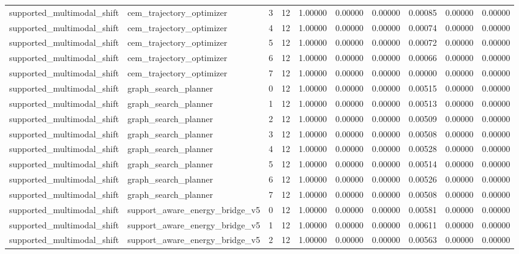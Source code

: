 \documentclass{article}
\begin{document}
\begin{table}[tbp]
{\begin{tabular}{llllllllll}
supported\_multimodal\_shift & cem\_trajectory\_optimizer & 3 & 12 & 1.00000 & 0.00000 & 0.00000 & 0.00085 & 0.00000 & 0.00000 \\
supported\_multimodal\_shift & cem\_trajectory\_optimizer & 4 & 12 & 1.00000 & 0.00000 & 0.00000 & 0.00074 & 0.00000 & 0.00000 \\
supported\_multimodal\_shift & cem\_trajectory\_optimizer & 5 & 12 & 1.00000 & 0.00000 & 0.00000 & 0.00072 & 0.00000 & 0.00000 \\
supported\_multimodal\_shift & cem\_trajectory\_optimizer & 6 & 12 & 1.00000 & 0.00000 & 0.00000 & 0.00066 & 0.00000 & 0.00000 \\
supported\_multimodal\_shift & cem\_trajectory\_optimizer & 7 & 12 & 1.00000 & 0.00000 & 0.00000 & 0.00000 & 0.00000 & 0.00000 \\
supported\_multimodal\_shift & graph\_search\_planner & 0 & 12 & 1.00000 & 0.00000 & 0.00000 & 0.00515 & 0.00000 & 0.00000 \\
supported\_multimodal\_shift & graph\_search\_planner & 1 & 12 & 1.00000 & 0.00000 & 0.00000 & 0.00513 & 0.00000 & 0.00000 \\
supported\_multimodal\_shift & graph\_search\_planner & 2 & 12 & 1.00000 & 0.00000 & 0.00000 & 0.00509 & 0.00000 & 0.00000 \\
supported\_multimodal\_shift & graph\_search\_planner & 3 & 12 & 1.00000 & 0.00000 & 0.00000 & 0.00508 & 0.00000 & 0.00000 \\
supported\_multimodal\_shift & graph\_search\_planner & 4 & 12 & 1.00000 & 0.00000 & 0.00000 & 0.00528 & 0.00000 & 0.00000 \\
supported\_multimodal\_shift & graph\_search\_planner & 5 & 12 & 1.00000 & 0.00000 & 0.00000 & 0.00514 & 0.00000 & 0.00000 \\
supported\_multimodal\_shift & graph\_search\_planner & 6 & 12 & 1.00000 & 0.00000 & 0.00000 & 0.00526 & 0.00000 & 0.00000 \\
supported\_multimodal\_shift & graph\_search\_planner & 7 & 12 & 1.00000 & 0.00000 & 0.00000 & 0.00508 & 0.00000 & 0.00000 \\
supported\_multimodal\_shift & support\_aware\_energy\_bridge\_v5 & 0 & 12 & 1.00000 & 0.00000 & 0.00000 & 0.00581 & 0.00000 & 0.00000 \\
supported\_multimodal\_shift & support\_aware\_energy\_bridge\_v5 & 1 & 12 & 1.00000 & 0.00000 & 0.00000 & 0.00611 & 0.00000 & 0.00000 \\
supported\_multimodal\_shift & support\_aware\_energy\_bridge\_v5 & 2 & 12 & 1.00000 & 0.00000 & 0.00000 & 0.00563 & 0.00000 & 0.00000 \\

\end{tabular}}
\end{table}
\end{document}
